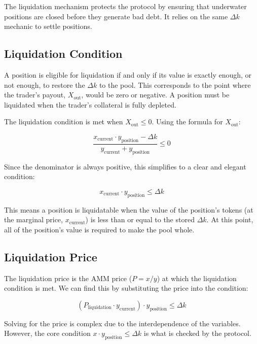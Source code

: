 \documentclass[11pt]{article}
\begin{document}
The liquidation mechanism protects the protocol by ensuring that underwater positions are closed before they generate bad debt. It relies on the same $\Delta k$ mechanic to settle positions.

\subsection{Liquidation Condition}

A position is eligible for liquidation if and only if its value is exactly enough, or not enough, to restore the $\Delta k$ to the pool. This corresponds to the point where the trader's payout, $X_{\text{out}}$, would be zero or negative. A position must be liquidated when the trader's collateral is fully depleted.

The liquidation condition is met when $X_{\text{out}} \le 0$. Using the formula for $X_{\text{out}}$:

\begin{equation}
\frac{x_{\text{current}} \cdot y_{\text{position}} - \Delta k}{y_{\text{current}} + y_{\text{position}}} \le 0
\end{equation}

Since the denominator is always positive, this simplifies to a clear and elegant condition:

\begin{equation}
x_{\text{current}} \cdot y_{\text{position}} \le \Delta k
\end{equation}

This means a position is liquidatable when the value of the position's tokens (at the marginal price, $x_{\text{current}}$) is less than or equal to the stored $\Delta k$. At this point, all of the position's value is required to make the pool whole.

\subsection{Liquidation Price}

The liquidation price is the AMM price ($P = x/y$) at which the liquidation condition is met. We can find this by substituting the price into the condition:

\begin{equation}
(P_{\text{liquidation}} \cdot y_{\text{current}}) \cdot y_{\text{position}} \le \Delta k
\end{equation}

Solving for the price is complex due to the interdependence of the variables. However, the core condition $x \cdot y_{\text{position}} \le \Delta k$ is what is checked by the protocol.
\end{document}

